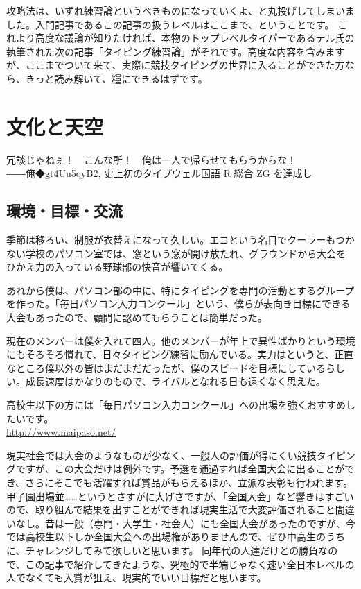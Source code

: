 \begin{screen}
攻略法は、いずれ練習論というべきものになっていくよ、と丸投げしてしまいました。入門記事であるこの記事の扱うレベルはここまで、ということです。
これより高度な議論が知りたければ、本物のトップレベルタイパーであるテル氏の執筆された次の記事「タイピング練習論」がそれです。高度な内容を含みますが、ここまでついて来て、実際に競技タイピングの世界に入ることができた方なら、きっと読み解いて、糧にできるはずです。
\end{screen}

\section{文化と天空}
\begin{screen}
冗談じゃねぇ！　こんな所！　俺は一人で帰らせてもらうからな！\\
――俺◆gt4Uu5qyB2, 史上初のタイプウェル国語 R 総合 ZG を達成し
\end{screen}

\subsection{環境・目標・交流}
季節は移ろい、制服が衣替えになって久しい。エコという名目でクーラーもつかない学校のパソコン室では、窓という窓が開け放たれ、グラウンドから大会をひかえ力の入っている野球部の快音が響いてくる。

あれから僕は、パソコン部の中に、特にタイピングを専門の活動とするグループを作った。「毎日パソコン入力コンクール」という、僕らが表向き目標にできる大会もあったので、顧問に認めてもらうことは簡単だった。

現在のメンバーは僕を入れて四人。他のメンバーが年上で異性ばかりという環境にもそろそろ慣れて、日々タイピング練習に励んでいる。実力はというと、正直なところ僕以外の皆はまだまだだったが、僕のスピードを目標にしているらしい。成長速度はかなりのもので、ライバルとなれる日も遠くなく思えた。

\begin{screen}
高校生以下の方には「毎日パソコン入力コンクール」への出場を強くおすすめしたいです。\\
\url{http://www.maipaso.net/}

現実社会では大会のようなものが少なく、一般人の評価が得にくい競技タイピングですが、この大会だけは例外です。予選を通過すれば全国大会に出ることができ、さらにそこでも活躍すれば賞品がもらえるほか、立派な表彰も行われます。
甲子園出場並……というとさすがに大げさですが、「全国大会」など響きはすごいので、取り組んで結果を出すことができれば現実生活で大変評価されること間違いなし。昔は一般（専門・大学生・社会人）にも全国大会があったのですが、今では高校生以下しか全国大会への出場権がありませんので、ぜひ中高生のうちに、チャレンジしてみて欲しいと思います。
同年代の人達だけとの勝負なので、この記事で紹介してきたような、究極的で半端じゃなく速い全日本レベルの人でなくても入賞が狙え、現実的でいい目標だと思います。
\end{screen}

